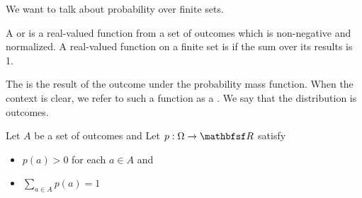 
\sbasic




























\sstart
{}


We want to talk about
probability over finite
sets.


A
or
is a real-valued function
from a set of outcomes which is
non-negative and normalized.
A real-valued function on a finite set
is  if the sum over
its results is 1.

The 
is the result of the outcome
under the probability mass function.
When the context is clear, we refer
to such a function as a .
We say that the distribution is 
outcomes.


Let $A$ be a set of outcomes and
Let $p: \Outcomes \to \R$ satisfy

\begin{itemize}

\item $p(a) > 0$ for each $a \in A$ and
\item $\sum_{a \in A} p(a) = 1$

\end{itemize}
\strats
